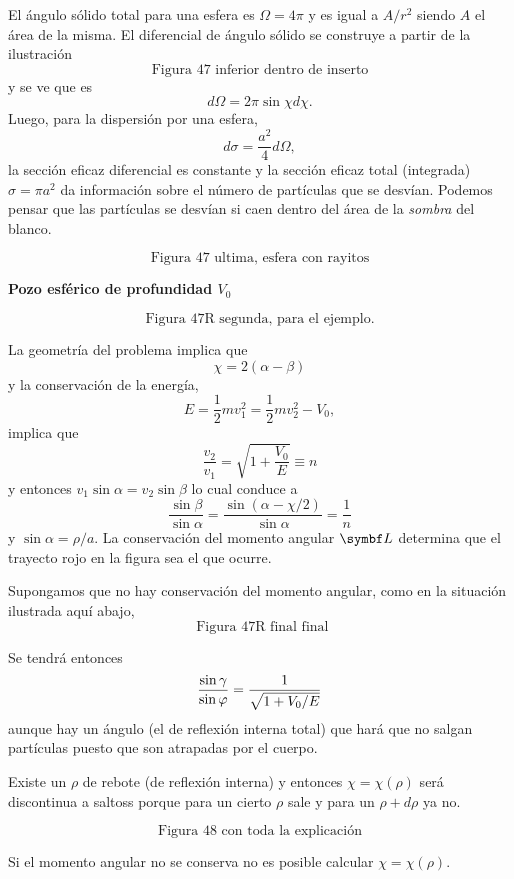 \documentclass[10pt,oneside]{CBFT_book}
\begin{document}
El ángulo sólido total para una esfera es $\Omega = 4 \pi $ y es igual a $A/r^2$ siendo $A$ el área de la
misma. El diferencial de ángulo sólido se construye a partir de la ilustración 
\[
	\mbox{ Figura 47 inferior dentro de inserto }
\]
y se ve que es 
\[
	d\Omega = 2 \pi \sin \chi d\chi.
\]
Luego, para la dispersión por una esfera,
\[
	d\sigma = \frac{a^2}{4} d\Omega,
\]
la sección eficaz diferencial es constante y la sección eficaz total (integrada) $\sigma = \pi a^2$ da
información sobre el número de partículas que se desvían. Podemos pensar que las partículas se desvían
si caen dentro del área de la {\it sombra} del blanco.

\[
	\mbox{ Figura 47 ultima, esfera con rayitos }
\]


\begin{ejemplo}{\bf Pozo esférico de profundidad $V_0$}
 
\[
	\mbox{ Figura 47R segunda, para el ejemplo. }
\] 
 
La geometría del problema implica que 
\[
	\chi = 2(\alpha - \beta)
\]
y la conservación de la energía,
\[
	E = \frac 1 2 m v_1^2 = \frac 1 2 m v_2^2 - V_0,
\]
implica que 
\[
	\frac {v_2} {v_1} = \sqrt{ 1 + \frac{V_0}{E}} \equiv n
\]
y entonces $ v_1 \sin \alpha = v_2 \sin \beta$ lo cual conduce a  
\[
	\frac{\sin \beta}{\sin \alpha} = \frac{\sin (\alpha - \chi/2 )}{\sin \alpha} = \frac 1 n
\]
y $\sin \alpha = \rho / a$.
La conservación del momento angular $\vb{L}$ determina que el trayecto rojo en la figura sea 
el que ocurre.

Supongamos que no hay conservación del momento angular, como en la situación ilustrada aquí abajo,
\[
	\mbox{ Figura 47R final final}
\]

Se tendrá entonces
\[
	\frac{\sin \gamma}{\sin \varphi} = \frac{1}{\sqrt{ 1 + V_0/E }}
\]
aunque hay un ángulo (el de reflexión interna total) que hará que no salgan partículas puesto que 
son atrapadas por el cuerpo.

Existe un $\rho$ de rebote (de reflexión interna) y entonces $\chi=\chi(\rho)$ será discontinua a 
saltoss porque para un cierto $\rho$ sale y para un $\rho + d\rho$ ya no.

\[
	\mbox{ Figura 48 con toda la explicación }
\]

Si el momento angular no se conserva no es posible calcular $\chi = \chi(\rho) $.
\end{ejemplo}
\end{document}
